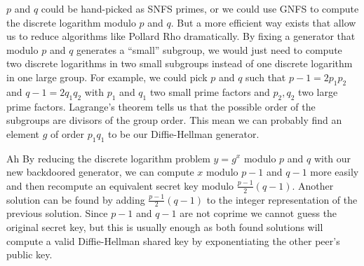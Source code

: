 \documentclass[a4paper,11pt,twocolumn]{article}
\begin{document}
$p$ and $q$ could be hand-picked as SNFS primes, or we could use GNFS to compute the discrete logarithm modulo $p$ and $q$. But a more efficient way exists that allow us to reduce algorithms like Pollard Rho dramatically. By fixing a generator that modulo $p$ and $q$ generates a ``small'' subgroup, we would just need to compute two discrete logarithms in two small subgroups instead of one discrete logarithm in one large group. For example, we could pick $p$ and $q$ such that $p-1 = 2p_1p_2$ and $q-1=2q_1q_2$ with $p_1$ and $q_1$ two small prime factors and $p_2, q_2$ two large prime factors. Lagrange's theorem tells us that the possible order of the subgroups are divisors of the group order. This mean we can probably find an element $g$ of order $p_1q_1$ to be our Diffie-Hellman generator.

\begin{center}
\end{center}

Ah  By reducing the discrete logarithm problem $y = g^x$ modulo $p$ and $q$ with our new backdoored generator, we can compute $x$ modulo $p-1$ and $q-1$ more easily and then recompute an equivalent secret key modulo $\frac{p-1}{2}(q-1)$. Another solution can be found by adding $\frac{p-1}{2}(q-1)$ to the integer representation of the previous solution. Since $p-1$ and $q-1$ are not coprime we cannot guess the original secret key, but this is usually enough as both found solutions will compute a valid Diffie-Hellman shared key by exponentiating the other peer's public key.\\
\end{document}
